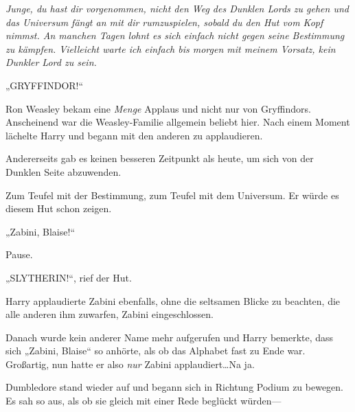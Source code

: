 \emph{Junge, du hast dir vorgenommen, nicht den Weg des Dunklen Lords zu gehen und das Universum fängt an mit dir rumzuspielen, sobald du den Hut vom Kopf nimmst. An manchen Tagen lohnt es sich einfach nicht gegen seine Bestimmung zu kämpfen. Vielleicht warte ich einfach bis morgen mit meinem Vorsatz, kein Dunkler Lord zu sein.}

„GRYFFINDOR!“

Ron Weasley bekam eine \emph{Menge} Applaus und nicht nur von Gryffindors. Anscheinend war die Weasley-Familie allgemein beliebt hier. Nach einem Moment lächelte Harry und begann mit den anderen zu applaudieren.

Andererseits gab es keinen besseren Zeitpunkt als heute, um sich von der Dunklen Seite abzuwenden.

Zum Teufel mit der Bestimmung, zum Teufel mit dem Universum. Er würde es diesem Hut schon zeigen.

„Zabini, Blaise!“

Pause.

„SLYTHERIN!“, rief der Hut.

Harry applaudierte Zabini ebenfalls, ohne die seltsamen Blicke zu beachten, die alle anderen ihm zuwarfen, Zabini eingeschlossen.

Danach wurde kein anderer Name mehr aufgerufen und Harry bemerkte, dass sich „Zabini, Blaise“ so anhörte, als ob das Alphabet fast zu Ende war. Großartig, nun hatte er also \emph{nur} Zabini applaudiert…Na ja.

Dumbledore stand wieder auf und begann sich in Richtung Podium zu bewegen. Es sah so aus, als ob sie gleich mit einer Rede beglückt würden—

